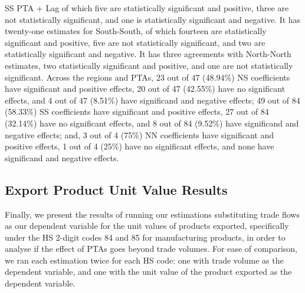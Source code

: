 \documentclass[12pt]{article}%
\begin{document}
SS PTA + Lag of which five are statistically significant and positive,
three are not statistically significant, and one is statistically
significant and negative. It has twenty-one estimates for South-South,
of which fourteen are statistically significant and positive, five are
not statistically significant, and two are statistically significant and
negative. It has three agreements with North-North estimates, two
statistically significant and positive, and one are not statistically
significant. Across the regions and PTAs, 23 out of 47 (48.94\%) NS
coefficients have significant and positive effects, 20 out of 47
(42.55\%) have no significant effects, and 4 out of 47 (8.51\%) have
significand and negative effects; 49 out of 84 (58.33\%) SS coefficients
have significant and positive effects, 27 out of 84 (32.14\%) have no
significant effects, and 8 out of 84 (9.52\%) have significand and
negative effects; and, 3 out of 4 (75\%) NN coefficients have
significant and positive effects, 1 out of 4 (25\%) have no significant
effects, and none have significand and negative effects.
%
%
%
%
\FloatBarrier%
%
\FloatBarrier%
%
\FloatBarrier

%
\subsection{Export Product Unit Value Results}%
\label{subsec:ExportProductUnitValueResults}%
Finally, we present the results of running our estimations substituting
trade flows as our dependent variable for the unit values of products
exported, specifically under the HS 2-digit codes 84 and 85 for
manufacturing products, in order to analyse if the effect of PTAs goes
beyond trade volumes. For ease of comparison, we ran each estimation
twice for each HS code: one with trade volume as the dependent variable,
and one with the unit value of the product exported as the dependent
variable.
\end{document}
